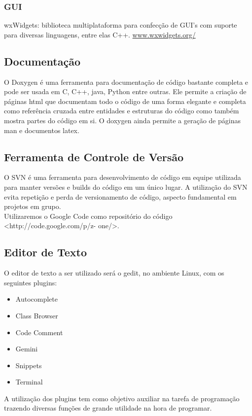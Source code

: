 \documentclass[12pt,a4paper]{article}
\begin{document}
\subsubsection{GUI}
	wxWidgets: biblioteca multiplataforma para confecção de GUI's com suporte para diversas linguagens, entre elas C++. \url{www.wxwidgets.org/}
	
\subsection{Documentação}
	O Doxygen é uma ferramenta para documentação de código bastante completa e pode ser
usada em C, C++, java, Python entre outras. Ele permite a criação de páginas html que documentam
todo o código de uma forma elegante e completa como referência cruzada entre entidades e estruturas
do código como também mostra partes do código em si. O doxygen ainda permite a geração de páginas
man e documentos latex.

\subsection{Ferramenta de Controle de Versão}
	O SVN é uma ferramenta para desenvolvimento de código em equipe utilizada para manter
versões e builds do código em um único lugar. A utilização do SVN evita repetição e perda de
versionamento de código, aspecto fundamental em projetos em grupo.\\
	Utilizaremos o Google Code como repositório do código <http://code.google.com/p/z-
one/>.

\subsection{Editor de Texto}
	O editor de texto a ser utilizado será o gedit, no ambiente Linux, com os seguintes plugins:
\begin{itemize}
\item Autocomplete
\item Class Browser
\item Code Comment
\item Gemini
\item Snippets
\item Terminal
\end{itemize}
	A utilização dos plugins tem como objetivo auxiliar na tarefa de programação trazendo diversas
funções de grande utilidade na hora de programar.
\end{document}
